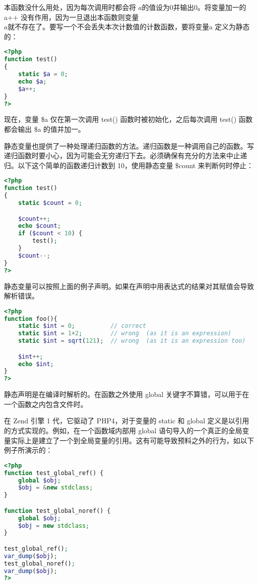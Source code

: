 本函数没什么用处，因为每次调用时都会将 $a 的值设为 0 并输出 0。将变量加一的 $a++ 没有作用，因为一旦退出本函数则变量 $a 就不存在了。要写一个不会丢失本次计数值的计数函数，要将变量 $a 定义为静态的：


\begin{lstlisting}[language=PHP]
<?php
function test()
{
    static $a = 0;
    echo $a;
    $a++;
}
?>
\end{lstlisting}

现在，变量 \$a 仅在第一次调用 test() 函数时被初始化，之后每次调用 test() 函数都会输出 \$a 的值并加一。

静态变量也提供了一种处理递归函数的方法。递归函数是一种调用自己的函数。写递归函数时要小心，因为可能会无穷递归下去。必须确保有充分的方法来中止递归。以下这个简单的函数递归计数到 10，使用静态变量 \$count 来判断何时停止：

\begin{lstlisting}[language=PHP]
<?php
function test()
{
    static $count = 0;

    $count++;
    echo $count;
    if ($count < 10) {
        test();
    }
    $count--;
}
?>
\end{lstlisting}

静态变量可以按照上面的例子声明。如果在声明中用表达式的结果对其赋值会导致解析错误。


\begin{lstlisting}[language=PHP]
<?php
function foo(){
    static $int = 0;          // correct
    static $int = 1+2;        // wrong  (as it is an expression)
    static $int = sqrt(121);  // wrong  (as it is an expression too)

    $int++;
    echo $int;
}
?>
\end{lstlisting}

静态声明是在编译时解析的。在函数之外使用 global 关键字不算错，可以用于在一个函数之内包含文件时。

在 Zend 引擎 1 代，它驱动了 PHP4，对于变量的 static 和 global 定义是以引用的方式实现的。例如，在一个函数域内部用 global 语句导入的一个真正的全局变量实际上是建立了一个到全局变量的引用。这有可能导致预料之外的行为，如以下例子所演示的：

\begin{lstlisting}[language=PHP]
<?php
function test_global_ref() {
    global $obj;
    $obj = &new stdclass;
}

function test_global_noref() {
    global $obj;
    $obj = new stdclass;
}

test_global_ref();
var_dump($obj);
test_global_noref();
var_dump($obj);
?>
\end{lstlisting}

